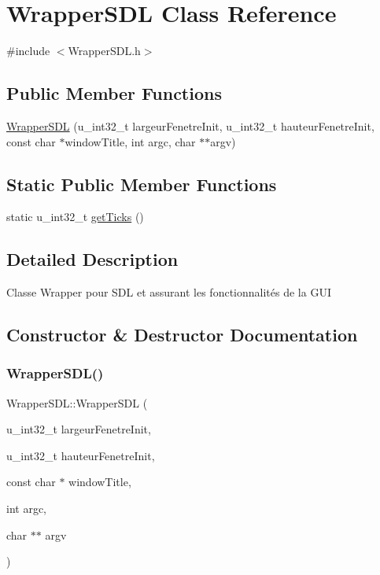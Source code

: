 \hypertarget{classWrapperSDL}{}\section{Wrapper\+S\+DL Class Reference}
\label{classWrapperSDL}


{\ttfamily \#include $<$Wrapper\+S\+D\+L.\+h$>$}

\subsection*{Public Member Functions}
\begin{DoxyCompactItemize}
\item 
\mbox{\hyperlink{classWrapperSDL_a92db5e2b1547f4c6aa7c228250677fad}{Wrapper\+S\+DL}} (u\+\_\+int32\+\_\+t largeur\+Fenetre\+Init, u\+\_\+int32\+\_\+t hauteur\+Fenetre\+Init, const char $\ast$window\+Title, int argc, char $\ast$$\ast$argv)
\end{DoxyCompactItemize}
\subsection*{Static Public Member Functions}
\begin{DoxyCompactItemize}
\item 
static u\+\_\+int32\+\_\+t \mbox{\hyperlink{classWrapperSDL_aae566cdc21799d852d48a49627f233dc}{get\+Ticks}} ()
\end{DoxyCompactItemize}


\subsection{Detailed Description}
Classe Wrapper pour S\+DL et assurant les fonctionnalités de la G\+UI 

\subsection{Constructor \& Destructor Documentation}
\mbox{\label{classWrapperSDL_a92db5e2b1547f4c6aa7c228250677fad}} 
\subsubsection{\texorpdfstring{WrapperSDL()}{WrapperSDL()}}
{\footnotesize\ttfamily Wrapper\+S\+D\+L\+::\+Wrapper\+S\+DL (\begin{DoxyParamCaption}\item[{u\+\_\+int32\+\_\+t}]{largeur\+Fenetre\+Init,  }\item[{u\+\_\+int32\+\_\+t}]{hauteur\+Fenetre\+Init,  }\item[{const char $\ast$}]{window\+Title,  }\item[{int}]{argc,  }\item[{char $\ast$$\ast$}]{argv }\end{DoxyParamCaption})}


